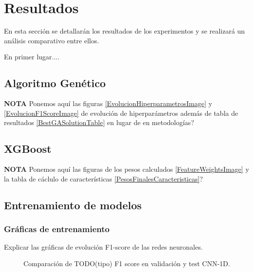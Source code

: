 
\chapter{Resultados}
\label{resultados}



  En esta sección se detallarán los resultados de los experimentos y se realizará un análisis comparativo entre ellos.


  En primer lugar....

\section{Algoritmo Genético}

  \textbf{NOTA} Ponemos aquí las figuras \ref{EvolucionHiperparametrosImage} y \ref{EvolucionF1ScoreImage} de evolución de hiperparámetros además de tabla de resultados \ref{BestGASolutionTable} en lugar de en metodologías?

\section{XGBoost}
  \textbf{NOTA} Ponemos aquí las figuras de los pesos calculados \ref{FeatureWeightsImage} y la tabla de cáclulo de características \ref{PesosFinalesCaracteristicas}?

\section{Entrenamiento de modelos}

  
  \subsection{Gráficas de entrenamiento}

    Explicar las gráficas de evolución F1-score de las redes neuronales.


    \begin{figure}[h]
        \centering
        
        \caption{Comparación de TODO(tipo) F1 score en validación y test CNN-1D.}
        \label{F1Score1DImage}
     \end{figure}


